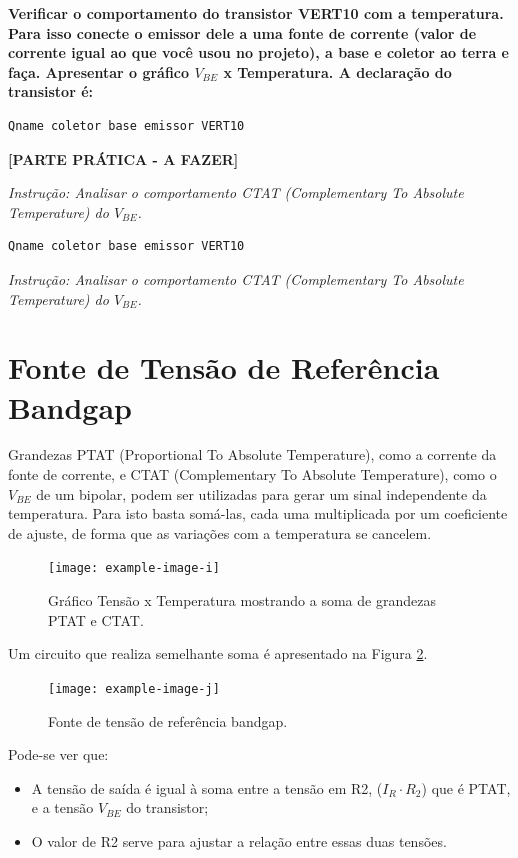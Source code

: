 \documentclass[12pt,a4paper]{article}
\begin{document}
\textbf{Verificar o comportamento do transistor VERT10 com a temperatura. Para isso conecte o emissor dele a uma fonte de corrente (valor de corrente igual ao que você usou no projeto), a base e coletor ao terra e faça. Apresentar o gráfico $V_{BE}$ x Temperatura. A declaração do transistor é:}

\begin{verbatim}
Qname coletor base emissor VERT10
\end{verbatim}

\textbf{[PARTE PRÁTICA - A FAZER]}

\textit{Instrução: Analisar o comportamento CTAT (Complementary To Absolute Temperature) do $V_{BE}$.}
\begin{verbatim}
Qname coletor base emissor VERT10
\end{verbatim}

\textit{Instrução: Analisar o comportamento CTAT (Complementary To Absolute Temperature) do $V_{BE}$.}

\section*{Fonte de Tensão de Referência Bandgap}

Grandezas PTAT (Proportional To Absolute Temperature), como a corrente da fonte de corrente, e CTAT (Complementary To Absolute Temperature), como o $V_{BE}$ de um bipolar, podem ser utilizadas para gerar um sinal independente da temperatura. Para isto basta somá-las, cada uma multiplicada por um coeficiente de ajuste, de forma que as variações com a temperatura se cancelem.

\begin{figure}[H]
    \centering
    \texttt{[image: example-image-i]}
    \caption{Gráfico Tensão x Temperatura mostrando a soma de grandezas PTAT e CTAT.}
    \label{fig:ptat_ctat}
\end{figure}

Um circuito que realiza semelhante soma é apresentado na Figura \ref{fig:bandgap_ref}.

\begin{figure}[H]
    \centering
    \texttt{[image: example-image-j]}
    \caption{Fonte de tensão de referência bandgap.}
    \label{fig:bandgap_ref}
\end{figure}

Pode-se ver que:
\begin{itemize}
    \item A tensão de saída é igual à soma entre a tensão em R2, ($I_R \cdot R_2$) que é PTAT, e a tensão $V_{BE}$ do transistor;
    \item O valor de R2 serve para ajustar a relação entre essas duas tensões.
\end{itemize}
\end{document}
